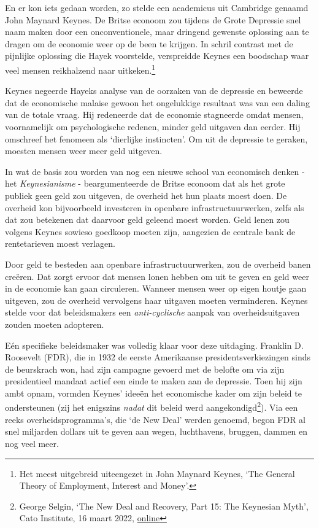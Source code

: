 \documentclass[
  a5paper,
  smalldemyvopaper,11pt,twoside,onecolumn,openright,extrafontsizes]{memoir}
\begin{document}
En er kon iets gedaan worden, zo stelde een academicus uit Cambridge
genaamd John Maynard Keynes. De Britse econoom zou tijdens de Grote
Depressie snel naam maken door een onconventionele, maar dringend
gewenste oplossing aan te dragen om de economie weer op de been te
krijgen. In schril contrast met de pijnlijke oplossing die Hayek
voorstelde, verspreidde Keynes een boodschap waar veel mensen
reikhalzend naar uitkeken.\footnote{Het meest uitgebreid uiteengezet in
  John Maynard Keynes, `The General Theory of Employment, Interest and
  Money'.}

Keynes negeerde Hayeks analyse van de oorzaken van de depressie en
beweerde dat de economische malaise gewoon het ongelukkige resultaat was
van een daling van de totale vraag. Hij redeneerde dat de economie
stagneerde omdat mensen, voornamelijk om psychologische redenen, minder
geld uitgaven dan eerder. Hij omschreef het fenomeen als `dierlijke
instincten'. Om uit de depressie te geraken, moesten mensen weer meer
geld uitgeven.

In wat de basis zou worden van nog een nieuwe school van economisch
denken - het \emph{Keynesianisme} - beargumenteerde de Britse econoom
dat als het grote publiek geen geld zou uitgeven, de overheid het hun
plaats moest doen. De overheid kon bijvoorbeeld investeren in openbare
infrastructuurwerken, zelfs als dat zou betekenen dat daarvoor geld
geleend moest worden. Geld lenen zou volgens Keynes sowieso goedkoop
moeten zijn, aangezien de centrale bank de rentetarieven moest verlagen.

Door geld te besteden aan openbare infrastructuurwerken, zou de overheid
banen creëren. Dat zorgt ervoor dat mensen lonen hebben om uit te geven
en geld weer in de economie kan gaan circuleren. Wanneer mensen weer op
eigen houtje gaan uitgeven, zou de overheid vervolgens haar uitgaven
moeten verminderen. Keynes stelde voor dat beleidsmakers een
\emph{anti-cyclische} aanpak van overheidsuitgaven zouden moeten
adopteren.

Eén specifieke beleidsmaker was volledig klaar voor deze uitdaging.
Franklin D. Roosevelt (FDR), die in 1932 de eerste Amerikaanse
presidentsverkiezingen sinds de beurskrach won, had zijn campagne
gevoerd met de belofte om via zijn presidentieel mandaat actief een
einde te maken aan de depressie. Toen hij zijn ambt opnam, vormden
Keynes' ideeën het economische kader om zijn beleid te ondersteunen (zij
het enigszins \emph{nadat} dit beleid werd aangekondigd\footnote{\hspace{0pt}George
  Selgin, `The New Deal and Recovery, Part 15: The Keynesian Myth', Cato
  Institute, 16 maart 2022,
  \href{https://www.cato.org/blog/new-deal-recovery-part-15-keynesian-myth.}{online}}).
Via een reeks overheidsprogramma's, die `de New Deal' werden genoemd,
begon FDR al snel miljarden dollars uit te geven aan wegen, luchthavens,
bruggen, dammen en nog veel meer.
\end{document}
